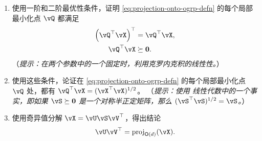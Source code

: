 \documentclass[../../book-main.tex]{subfiles}
\begin{document}
\begin{exercise}
\begin{enumerate}
        \begin{enumerate}
            \item 使用一阶和二阶最优性条件，证明 \eqref{eq:projection-onto-ogrp-defn} 的每个局部最小化点 $\vQ$ 都满足
            \begin{align*}
                \left( \vQ^\top \vX \right)^\top &= \vQ^\top \vX, \\
                \vQ^\top \vX &\succeq \mathbf{0}.
            \end{align*}
            （\textit{提示：在两个参数中的一个固定时，利用克罗内克积的线性性。}）
            \item 使用这些条件，论证在 \eqref{eq:projection-onto-ogrp-defn} 的每个局部最小化点 $\vQ$ 处，都有 $\vQ^\top \vX = (\vX^\top \vX)^{1/2}$。
            （\textit{提示：使用%
            线性代数中的一个事实，即如果 $\vS \succeq \mathbf{0}$ 是一个对称半正定矩阵，那么 $(\vS^\top\vS)^{1/2} = \vS$。}）
            \item 使用奇异值分解 $\vX = \vU \vS \vV^\top$，得出结论
            \begin{equation*}
                \vU \vV^\top
                =
                \mathrm{proj}_{\O(d)}(\vX).
            \end{equation*}
        \end{enumerate}
    \end{enumerate}
\end{exercise}

\end{document}
